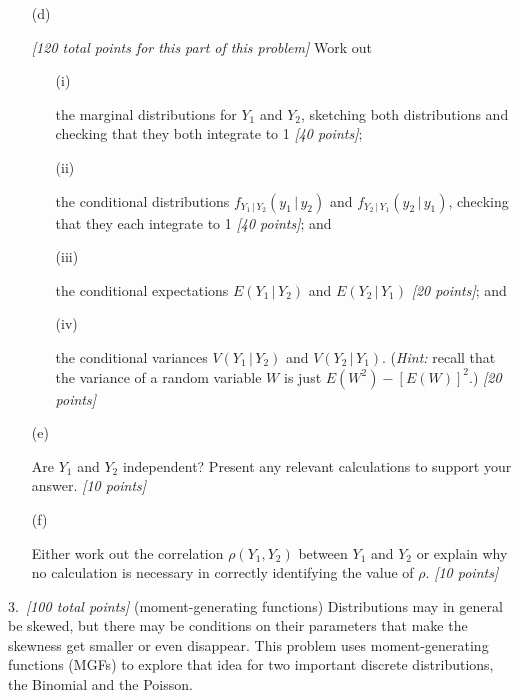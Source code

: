 \documentclass[12pt]{article}
\newcommand{\given}{\, | \,}
\begin{document}
\begin{itemize}
\begin{itemize}
\end{itemize}

\item[(d)]

\textit{[120 total points for this part of this problem]} Work out 

\begin{itemize}

\item[(i)]

the marginal distributions for $Y_1$ and $Y_2$, sketching both distributions and checking that they both integrate to 1 \textit{[40 points]};

\item[(ii)]

the conditional distributions $f_{ Y_1 \given Y_2 } ( y_1 \given y_2 )$ and $f_{ Y_2 \given Y_1 } ( y_2 \given y_1 )$, checking that they each integrate to 1 \textit{[40 points]}; and 

\item[(iii)]

the conditional expectations $E ( Y_1 \given Y_2 )$ and $E ( Y_2 \given Y_1 )$ \textit{[20 points]}; and

\item[(iv)]

the conditional variances $V ( Y_1 \given Y_2 )$ and $V ( Y_2 \given Y_1 )$. (\textit{Hint:} recall that the variance of a random variable $W$ is just $E \left( W^2 \right) - [ E ( W ) ]^2$.) \textit{[20 points]}

\end{itemize}

\item[(e)]

Are $Y_1$ and $Y_2$ independent? Present any relevant calculations to support your answer. \textit{[10 points]}

\item[(f)]

Either work out the correlation $\rho ( Y_1, Y_2 )$ between $Y_1$ and $Y_2$ or explain why no calculation is necessary in correctly identifying the value of $\rho$. \textit{[10 points]}

\end{itemize}

3.~\textit{[100 total points]} (moment-generating functions) Distributions may in general be skewed, but there may be conditions on their parameters that make the skewness get smaller or even disappear. This problem uses moment-generating functions (MGFs) to explore that idea for two important discrete distributions, the Binomial and the Poisson.
\end{document}
